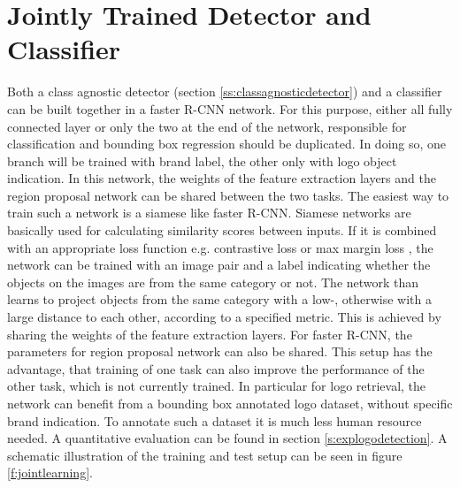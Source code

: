 \section{Jointly Trained Detector and Classifier}\label{ss:solution5}
Both a class agnostic detector (section \ref{ss:classagnosticdetector}) and a classifier can be built together in a faster R-CNN network. For this purpose, either all fully connected layer or only the two at the end of the network, responsible for classification and bounding box regression should be duplicated. In doing so, one branch will be trained with brand label, the other only with logo object indication. In this network, the weights of the feature extraction layers and the region proposal network can be shared between the two tasks. The easiest way to train such a network is a siamese like faster R-CNN.
\bigbreak
Siamese networks \cite{Hadsell06dimensionalityreduction} are basically used for calculating similarity scores between inputs. If it is combined with an appropriate loss function e.g. contrastive loss \cite{Hadsell06dimensionalityreduction} or max margin loss \cite{Simonyan13}\cite{ies_2016_herrmann_low_quality}, the network can be trained with an image pair and a label indicating whether the objects on the images are from the same category or not. The network than learns to project objects from the same category with a low-, otherwise with a large distance to each other, according to a specified metric. This is achieved by sharing the weights of the feature extraction layers.
\bigbreak
For faster R-CNN, the parameters for region proposal network can also be shared. This setup has the advantage, that training of one task can also improve the performance of the other task, which is not currently trained. In particular for logo retrieval, the network can benefit from a bounding box annotated logo dataset, without specific brand indication. To annotate such a dataset it is much less human resource needed. A quantitative evaluation can be found in section \ref{s:explogodetection}. A schematic illustration of the training and test setup can be seen in figure \ref{f:jointlearning}.
\bigbreak
